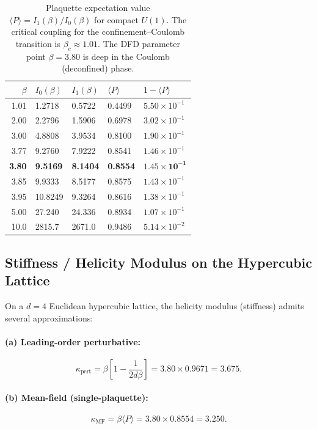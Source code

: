 \documentclass[12pt,a4paper]{article}
\begin{document}
\begin{table}[h]
\centering
\begin{tabular}{@{}rllll@{}}
\toprule
$\beta$ & $I_0(\beta)$ & $I_1(\beta)$ & $\langle P\rangle$ & $1-\langle P\rangle$ \\
\midrule
1.01 & 1.2718 & 0.5722 & 0.4499 & $5.50\times 10^{-1}$ \\
2.00 & 2.2796 & 1.5906 & 0.6978 & $3.02\times 10^{-1}$ \\
3.00 & 4.8808 & 3.9534 & 0.8100 & $1.90\times 10^{-1}$ \\
3.77 & 9.2760 & 7.9222 & 0.8541 & $1.46\times 10^{-1}$ \\
\textbf{3.80} & \textbf{9.5169} & \textbf{8.1404} & \textbf{0.8554} & $\mathbf{1.45\times 10^{-1}}$ \\
3.85 & 9.9333 & 8.5177 & 0.8575 & $1.43\times 10^{-1}$ \\
3.95 & 10.8249 & 9.3264 & 0.8616 & $1.38\times 10^{-1}$ \\
5.00 & 27.240 & 24.336 & 0.8934 & $1.07\times 10^{-1}$ \\
10.0 & 2815.7 & 2671.0 & 0.9486 & $5.14\times 10^{-2}$ \\
\bottomrule
\end{tabular}
\caption{Plaquette expectation value $\langle P\rangle = I_1(\beta)/I_0(\beta)$
for compact $U(1)$.  The critical coupling for the confinement--Coulomb
transition is $\beta_c \approx 1.01$.  The DFD parameter point $\beta = 3.80$
is deep in the Coulomb (deconfined) phase.}
\label{tab:plaquette}
\end{table}


\subsection{Stiffness / Helicity Modulus on the Hypercubic Lattice}

On a $d=4$ Euclidean hypercubic lattice, the helicity modulus (stiffness)
admits several approximations:

\paragraph{(a) Leading-order perturbative:}
\begin{equation}
  \kappa_{\text{pert}} = \beta\!\left[1 - \frac{1}{2d\beta}\right]
  = 3.80 \times 0.9671 = 3.675.
\end{equation}

\paragraph{(b) Mean-field (single-plaquette):}
\begin{equation}
  \kappa_{\text{MF}} = \beta \langle P \rangle
  = 3.80 \times 0.8554 = 3.250.
\end{equation}
\end{document}
